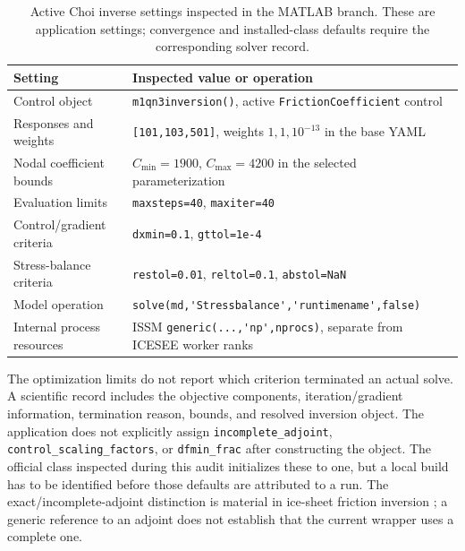 \documentclass[11pt,a4paper]{article}
\newcommand{\code}[1]{\nolinkurl{#1}}
\begin{document}
\begin{table}[htbp]\centering\small
\caption{Active Choi inverse settings inspected in the MATLAB branch. These are application settings; convergence and installed-class defaults require the corresponding solver record.}\label{tab:inversecontrols}
\begin{tabular}{p{.36\linewidth}p{.55\linewidth}}\toprule
Setting & Inspected value or operation\\\midrule
Control object & \code{m1qn3inversion()}, active \code{FrictionCoefficient} control\\
Responses and weights & \code{[101,103,501]}, weights \(1,1,10^{-13}\) in the base YAML\\
Nodal coefficient bounds & \(C_{\min}=1900\), \(C_{\max}=4200\) in the selected parameterization\\
Evaluation limits & \code{maxsteps=40}, \code{maxiter=40}\\
Control/gradient criteria & \code{dxmin=0.1}, \code{gttol=1e-4}\\
Stress-balance criteria & \code{restol=0.01}, \code{reltol=0.1}, \code{abstol=NaN}\\
Model operation & \code{solve(md,'Stressbalance','runtimename',false)}\\
Internal process resources & ISSM \code{generic(...,'np',nprocs)}, separate from ICESEE worker ranks\\\bottomrule
\end{tabular}
\end{table}

The optimization limits do not report which criterion terminated an actual solve. A scientific record includes the objective components, iteration/gradient information, termination reason, bounds, and resolved inversion object. The application does not explicitly assign \code{incomplete_adjoint}, \code{control_scaling_factors}, or \code{dfmin_frac} after constructing the object. The official class inspected during this audit initializes these to one, but a local build has to be identified before those defaults are attributed to a run. The exact/incomplete-adjoint distinction is material in ice-sheet friction inversion \citep{morlighem2013}; a generic reference to an adjoint does not establish that the current wrapper uses a complete one.
\end{document}
